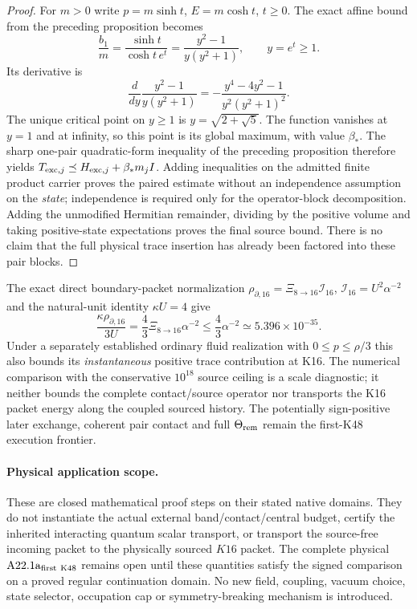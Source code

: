 \documentclass[12pt,a4paper]{article}
\begin{document}
\begin{proof}
For $m>0$ write $p=m\sinh t$, $E=m\cosh t$, $t\ge0$.
The exact affine bound from the preceding proposition becomes
\[
 \frac{b_1}{m}=\frac{\sinh t}{\cosh t\,e^t}
 =\frac{y^2-1}{y(y^2+1)},\qquad y=e^t\ge1.
\]
Its derivative is
\[
 \frac{d}{dy}\frac{y^2-1}{y(y^2+1)}
 =-\frac{y^4-4y^2-1}{y^2(y^2+1)^2}.
\]
The unique critical point on $y\ge1$ is
$y=\sqrt{2+\sqrt5}$. The function vanishes at $y=1$ and at
infinity, so this point is its global maximum, with value
$\beta_*$. The sharp one-pair quadratic-form inequality of the
preceding proposition therefore yields
$T_{{\rm exc},j}\preceq H_{{\rm exc},j}+\beta_*m_jI$.
Adding inequalities on the admitted finite product carrier proves
the paired estimate without an independence assumption on the
\emph{state}; independence is required only for the operator-block
decomposition. Adding the unmodified Hermitian remainder, dividing
by the positive volume and taking positive-state expectations proves
the final source bound. There is no claim that the full physical
trace insertion has already been factored into these pair blocks.
\end{proof}

\begin{remark}
\label{p8:rem:v2256-k48-direct-packet-diagnostic}
The exact direct boundary-packet normalization
$\rho_{\partial,16}=\Xi_{8\to16}\mathcal I_{16}$,
$\mathcal I_{16}=U^2\alpha^{-2}$ and the natural-unit identity
$\kappa U=4$ give
\[
 \boxed{\frac{\kappa\rho_{\partial,16}}{3U}
 =\frac43\Xi_{8\to16}\alpha^{-2}
 \le\frac43\alpha^{-2}
 \simeq5.396\times10^{-35}.}
\]
Under a separately established ordinary fluid realization with
$0\le p\le\rho/3$ this also bounds its \emph{instantaneous}
positive trace contribution at K16. The numerical comparison with
the conservative $10^{18}$ source ceiling is a scale diagnostic;
it neither bounds the complete contact/source operator nor transports
the K16 packet energy along the coupled sourced history. The
potentially sign-positive later exchange, coherent pair contact and
full $\Theta_{\rm rem}$ remain the first-K48 execution frontier.
\end{remark}

\paragraph{Physical application scope.}
These are closed mathematical proof steps on their stated native domains.
They do not instantiate the actual external band/contact/central budget,
certify the inherited interacting quantum scalar transport, or transport
the source-free incoming packet to the physically sourced $K16$ packet.
The complete physical $\mathrm{A22.1a}_{\rm first\ K48}$ remains open
until these quantities satisfy the signed comparison on a proved regular
continuation domain. No new field, coupling, vacuum choice, state selector,
occupation cap or symmetry-breaking mechanism is introduced.
\end{document}
